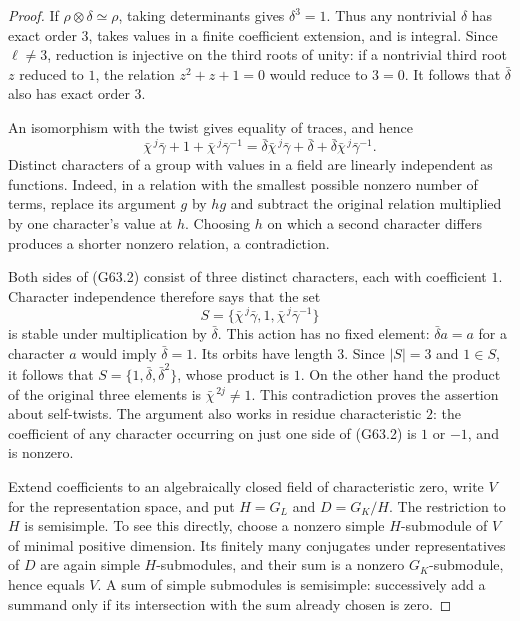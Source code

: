 \begin{proof}
If $\rho\otimes\delta\simeq\rho$, taking determinants gives
$\delta^3=1$.  Thus any nontrivial $\delta$ has exact order $3$, takes
values in a finite coefficient extension, and is integral.  Since
$\ell\ne3$, reduction is injective on the third roots of unity:
if a nontrivial third root $z$ reduced to $1$, the relation
$z^2+z+1=0$ would reduce to $3=0$.  It follows that
$\bar\delta$ also has exact order $3$.

An isomorphism with the twist gives equality of traces, and hence
\[
 \bar\chi^{\,j}\bar\gamma+1+
       \bar\chi^{\,j}\bar\gamma^{-1}
 =\bar\delta\bar\chi^{\,j}\bar\gamma+\bar\delta+
       \bar\delta\bar\chi^{\,j}\bar\gamma^{-1}.             \tag{G63.2}
\]
Distinct characters of a group with values in a field are linearly
independent as functions.  Indeed, in a relation with the smallest
possible nonzero number of terms, replace its argument $g$ by $hg$
and subtract the original relation multiplied by one character's
value at $h$.  Choosing $h$ on which a second character differs
produces a shorter nonzero relation, a contradiction.

Both sides of (G63.2) consist of three distinct characters, each with
coefficient $1$.  Character independence therefore says that the set
\[
 S=\{\bar\chi^{\,j}\bar\gamma,1,
                                  \bar\chi^{\,j}\bar\gamma^{-1}\}
\]
is stable under multiplication by $\bar\delta$.  This action has no
fixed element: $\bar\delta a=a$ for a character $a$ would imply
$\bar\delta=1$.  Its orbits have length $3$.  Since $|S|=3$ and
$1\in S$, it follows that
$S=\{1,\bar\delta,\bar\delta^2\}$, whose product is $1$.
On the other hand the product of the original three elements is
$\bar\chi^{\,2j}\ne1$.  This contradiction proves the assertion
about self-twists.  The argument also works in residue characteristic
$2$: the coefficient of any character occurring on just one side of
(G63.2) is $1$ or $-1$, and is nonzero.

Extend coefficients to an algebraically closed field of characteristic
zero, write $V$ for the representation space, and put
$H=G_L$ and $D=G_K/H$.  The restriction to $H$ is semisimple.  To see
this directly, choose a nonzero simple $H$-submodule of $V$ of minimal
positive dimension.  Its finitely many conjugates under representatives
of $D$ are again simple $H$-submodules, and their sum is a nonzero
$G_K$-submodule, hence equals $V$.  A sum of simple submodules is
semisimple: successively add a summand only if its intersection with
the sum already chosen is zero.


\end{proof}

